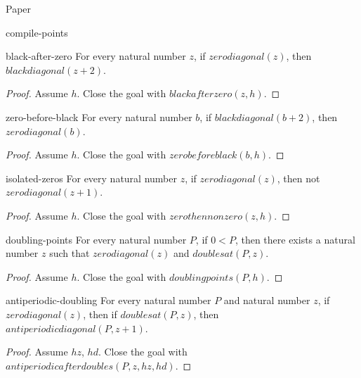 \begin{lexlean}{Paper}
\begin{section}{compile-points}
  \begin{theorem}{black-after-zero}
  For every natural number \(z\), if \(zerodiagonal(z)\), then \(blackdiagonal(z + 2)\).
  \begin{proof}
  Assume \(h\).
  Close the goal with \(blackafterzero(z, h)\).
  \end{proof}
  \end{theorem}

  \begin{theorem}{zero-before-black}
  For every natural number \(b\), if \(blackdiagonal(b + 2)\), then \(zerodiagonal(b)\).
  \begin{proof}
  Assume \(h\).
  Close the goal with \(zerobeforeblack(b, h)\).
  \end{proof}
  \end{theorem}

  \begin{theorem}{isolated-zeros}
  For every natural number \(z\), if \(zerodiagonal(z)\), then not \(zerodiagonal(z + 1)\).
  \begin{proof}
  Assume \(h\).
  Close the goal with \(zerothennonzero(z, h)\).
  \end{proof}
  \end{theorem}

  \begin{theorem}{doubling-points}
  For every natural number \(P\), if \(0 < P\), then there exists a natural number \(z\) such that \(zerodiagonal(z)\) and \(doublesat(P, z)\).
  \begin{proof}
  Assume \(h\).
  Close the goal with \(doublingpoints(P, h)\).
  \end{proof}
  \end{theorem}

  \begin{theorem}{antiperiodic-doubling}
  For every natural number \(P\) and natural number \(z\), if \(zerodiagonal(z)\), then if \(doublesat(P, z)\), then \(antiperiodicdiagonal(P, z + 1)\).
  \begin{proof}
  Assume \(hz\), \(hd\).
  Close the goal with \(antiperiodicafterdoubles(P, z, hz, hd)\).
  \end{proof}
  \end{theorem}


\end{section}
\end{lexlean}

